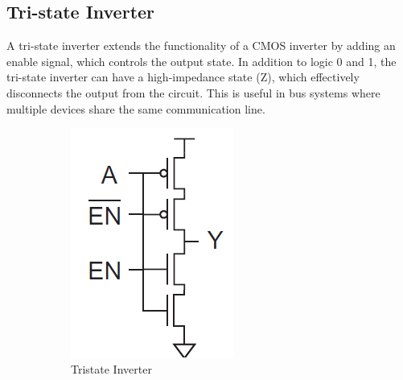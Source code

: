 \documentclass[a4paper,12pt]{article}
\begin{document}
\subsection{Tri-state Inverter}
A tri-state inverter extends the functionality of a CMOS inverter by adding an enable signal, which controls the output state. In addition to logic 0 and 1, the tri-state inverter can have a high-impedance state (Z), which effectively disconnects the output from the circuit. This is useful in bus systems where multiple devices share the same communication line.
\begin{figure}[H]
	\centering
	\begin{subfigure}[t]{0.30\textwidth}
		\centering
		\includegraphics[width=.89\linewidth]{images/t/ti1.2}
		\caption{Tristate Inverter}
	\end{subfigure}
	\hfill
	\begin{subfigure}[t]{0.3\textwidth}
		\centering

\end{subfigure}
\end{figure}
\end{document}
